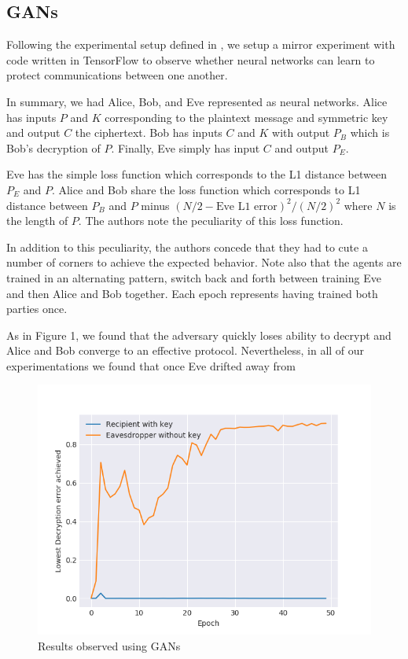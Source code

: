 \documentclass{llncs}
\begin{document}
\subsection{GANs}

Following the experimental setup defined in \cite{abadi2016learning}, we setup a mirror experiment with code written in TensorFlow to observe whether neural networks can learn to protect communications between one another.

In summary, we had Alice, Bob, and Eve represented as neural networks. Alice has inputs $P$ and $K$ corresponding to the plaintext message and symmetric key and output $C$ the ciphertext. Bob has inputs $C$ and $K$ with output $P_B$ which is Bob's decryption of $P$. Finally, Eve simply has input $C$ and output $P_E$. 

Eve has the simple loss function which corresponds to the L1 distance between $P_E$ and $P$. Alice and Bob share the loss function which corresponds to L1 distance between $P_B$ and $P$ minus $(N/2 - \text{Eve L1 error})^2/(N/2)^2$ where $N$ is the length of $P$. The authors note the peculiarity of this loss function.

In addition to this peculiarity, the authors concede that they had to cute a number of corners to achieve the expected behavior. Note also that the agents are trained in an alternating pattern, switch back and forth between training Eve and then Alice and Bob together. Each epoch represents having trained both parties once. 

As in Figure 1, we found that the adversary quickly loses ability to decrypt and Alice and Bob converge to an effective protocol. Nevertheless, in all of our experimentations we found that once Eve drifted away from   
\begin{figure}
  \centering
    \includegraphics[width=\textwidth]{GAN_anc.png}
    \caption{Results observed using GANs}
\end{figure}
\end{document}
